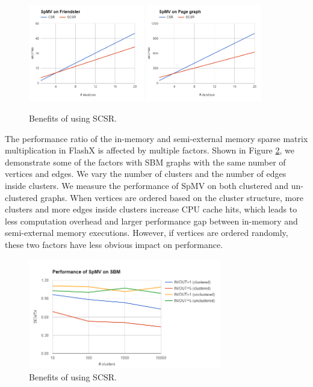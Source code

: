 \documentclass[simplex.tex]{subfiles}
\begin{document}
\begin{figure}[h!]
\begin{cframed}
\centering
\includegraphics[width=0.45\textwidth]{./figs/SpMV-friendster.png}
\includegraphics[width=0.45\textwidth]{./figs/SpMV-pagegraph.png}
\caption{
Benefits of using SCSR.
}
\label{fig:flashx1}
\end{cframed}
\end{figure}

The performance ratio of the in-memory and semi-external memory sparse
matrix multiplication in FlashX is affected by multiple factors. Shown
in Figure \ref{fig:flashx2}, we demonstrate some of the factors with SBM
graphs with the same number of vertices and edges. We vary the number of
clusters and the number of edges inside clusters. We measure the
performance of SpMV on both clustered and un-clustered graphs. When
vertices are ordered based on the cluster structure, more clusters and
more edges inside clusters increase CPU cache hits, which leads to less
computation overhead and larger performance gap between in-memory and
semi-external memory executions. However, if vertices are ordered
randomly, these two factors have less obvious impact on performance.

\begin{figure}[h!]
\begin{cframed}
\centering
\includegraphics[width=0.75\textwidth]{./figs/SpMV-sbm.png}
\caption{
Benefits of using SCSR.
}
\label{fig:flashx2}
\end{cframed}
\end{figure}
\end{document}

